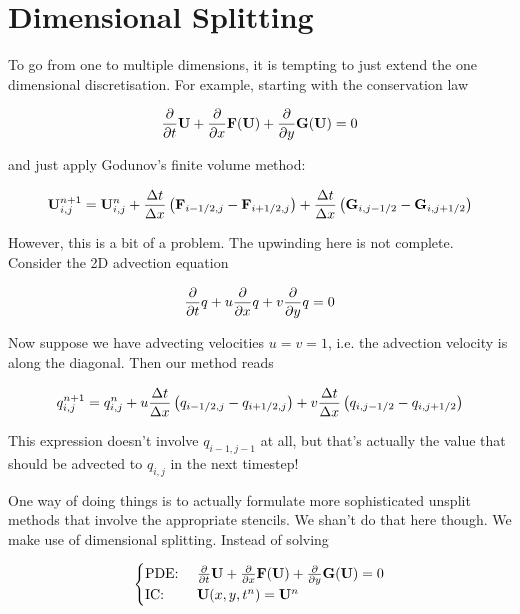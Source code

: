 \newpage
\section{Dimensional Splitting}\label{chap:dimensional-splitting}


To go from one to multiple dimensions, it is tempting to just extend the one dimensional discretisation.
For example, starting with the conservation law

\begin{equation}
	\frac{\partial}{\partial t}{\mathbf{U}} + \frac{\partial}{\partial x}{\mathbf{F}(\mathbf{U})} + \frac{\partial}{\partial y} \mathbf{G}(\mathbf{U}) = 0
\end{equation}


and just apply Godunov's finite volume method:

\begin{equation}
	\mathbf{U}_{i,j}^{n+1} = 
					\mathbf{U}_{i,j}^n 
					+ \frac{\Delta t}{\Delta x} \left( \mathbf{F}_{i - 1/2, j} - \mathbf{F}_{i + 1/2, j}\right) 
					+ \frac{\Delta t}{\Delta x} \left( \mathbf{G}_{i ,j - 1/2} - \mathbf{G}_{i, j + 1/2}\right) 
\end{equation}


However, this is a bit of a problem.
The upwinding here is not complete.
Consider the 2D advection equation

\begin{equation}
	\frac{\partial}{\partial t}{q} + u\frac{\partial}{\partial x}{q} + v \frac{\partial}{\partial y} q = 0
\end{equation}

Now suppose we have advecting velocities $u = v = 1$, i.e. the advection velocity is along the diagonal.
Then our method reads 

\begin{equation}
	q_{i,j}^{n+1} = 
					q_{i,j}^n 
					+ u \frac{\Delta t}{\Delta x} \left( q_{i - 1/2, j} - q_{i + 1/2, j}\right) 
					+ v \frac{\Delta t}{\Delta x} \left( q_{i ,j - 1/2} - q_{i, j + 1/2}\right) 
\end{equation}

This expression doesn't involve $q_{i-1, j-1}$ at all, but that's actually the value that should be advected to $q_{i, j}$ in the next timestep!


One way of doing things is to actually formulate more sophisticated unsplit methods that involve the appropriate stencils.
We shan't do that here though.
We make use of dimensional splitting. 
Instead of solving

\begin{equation}
	\begin{cases}
		\text{PDE: } & \frac{\partial}{\partial t}{\mathbf{U}} + \frac{\partial}{\partial x}{\mathbf{F}(\mathbf{U})} + \frac{\partial}{\partial y} \mathbf{G}(\mathbf{U}) = 0\\
		\text{IC: } & \mathbf{U}(x, y, t^n) = \mathbf{U}^n
	\end{cases}
\end{equation}


